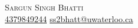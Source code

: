 \documentclass{article}
\begin{document}
        \begin{center} {\Huge \scshape Sargun Singh Bhatti} \vspace{2pt} \\
        \href{tel:4379849244}{4379849244}
        \vline \hspace{.5pt} \href{mailto:ss2bhatt@uwaterloo.ca}{ss2bhatt@uwaterloo.ca} 
\end{center} 
\end{document}
